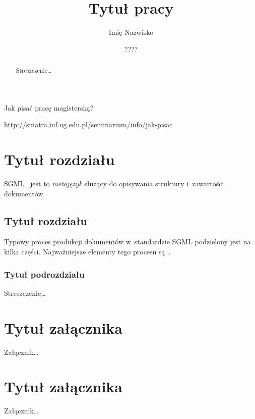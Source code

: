 \documentclass[brudnopis]{xmgr}
\author   {Imię Nazwisko}
\title    {Tytuł pracy}
\date     {????}
\begin{document}
\begin{abstract}
  Streszczenie…
\end{abstract}

\maketitle

\introduction

Jak pisać pracę magisterską?

\url{http://sinatra.inf.ug.edu.pl/seminarium/info/jak-pisac}


\chapter{Tytuł rozdziału}

SGML~\cite{Goldfarb:2002:CFG} jest to \emph{metajęzyk} 
służący do opisywania struktury i~zawartości dokumentów.
    
\section{Tytuł rozdziału}

Typowy proces produkcji dokumentów w~standardzie SGML
podzielony jest na kilka części. Najważniejsze elementy tego
procesu są~\cite[opisane tutaj]{Eisenberg:2002:SXM}.

\subsection{Tytuł podrozdziału}

\summary

Streszczenie…

\appendix
\chapter{Tytuł załącznika}

Załącznik…

\chapter{Tytuł załącznika}

Załącznik…






\oswiadczenie
\end{document}
